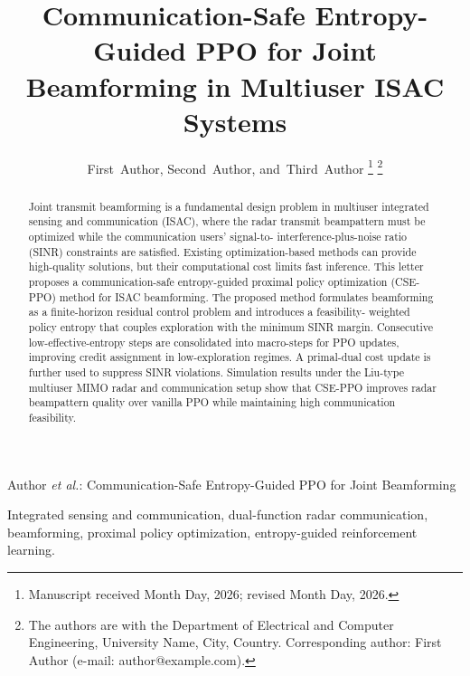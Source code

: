 \documentclass[10pt,journal]{IEEEtran}
\begin{document}
\title{Communication-Safe Entropy-Guided PPO for Joint Beamforming in Multiuser ISAC Systems}

\author{First~Author,
        Second~Author,
        and~Third~Author%
\thanks{Manuscript received Month Day, 2026; revised Month Day, 2026.}
\thanks{The authors are with the Department of Electrical and Computer
Engineering, University Name, City, Country. Corresponding author:
First Author (e-mail: author@example.com).}
}

%
{Author \MakeLowercase{\textit{et al.}}: Communication-Safe Entropy-Guided PPO for Joint Beamforming}

\maketitle

\begin{abstract}
Joint transmit beamforming is a fundamental design problem in multiuser
integrated sensing and communication (ISAC), where the radar transmit
beampattern must be optimized while the communication users' signal-to-
interference-plus-noise ratio (SINR) constraints are satisfied. Existing
optimization-based methods can provide high-quality solutions, but their
computational cost limits fast inference. This letter proposes a
communication-safe entropy-guided proximal policy optimization (CSE-PPO)
method for ISAC beamforming. The proposed method formulates beamforming as
a finite-horizon residual control problem and introduces a feasibility-
weighted policy entropy that couples exploration with the minimum SINR
margin. Consecutive low-effective-entropy steps are consolidated into
macro-steps for PPO updates, improving credit assignment in low-exploration
regimes. A primal-dual cost update is further used to suppress SINR
violations. Simulation results under the Liu-type multiuser MIMO radar and
communication setup show that CSE-PPO improves radar beampattern quality
over vanilla PPO while maintaining high communication feasibility.
\end{abstract}

\begin{IEEEkeywords}
Integrated sensing and communication, dual-function radar communication,
beamforming, proximal policy optimization, entropy-guided reinforcement
learning.
\end{IEEEkeywords}
\end{document}
